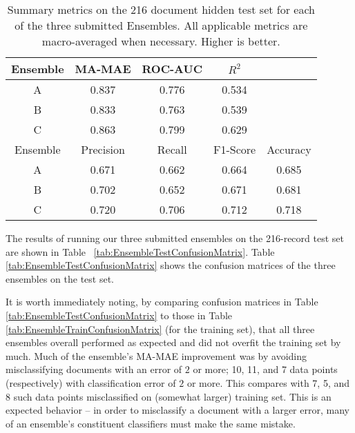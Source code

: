 \begin{table}
\centering
    \begin{tabular}{|c|c|c|c|c|}
        \hline
        \textsf{ Ensemble } & \textsf{ MA-MAE } & \textsf{ ROC-AUC } & \textsf{ $R^2$ } & \\
        \hline
       \cellcolor{gray!15} \textsf{ A } & 0.837 & 0.776 & 0.534 & \\ 
       \cellcolor{gray!15} \textsf{ B } & 0.833 & 0.763 & 0.539 & \\ 
       \cellcolor{gray!15} \textsf{ C } & \cellcolor{gray!15} 0.863 & \cellcolor{gray!15} 0.799 & \cellcolor{gray!15} 0.629 & \\ 
       \hline
        \textsf{ Ensemble } & \textsf{ Precision } & \textsf{ Recall } & \textsf{ F1-Score } & \textsf{ Accuracy } \\
        \hline
       \cellcolor{gray!15} \textsf{ A } & 0.671 & 0.662 & 0.664 & 0.685 \\ 
       \cellcolor{gray!15} \textsf{ B } & 0.702 & 0.652 & 0.671 & 0.681 \\ 
       \cellcolor{gray!15} \textsf{ C } & \cellcolor{gray!15} 0.720 & \cellcolor{gray!15} 0.706 & \cellcolor{gray!15} 0.712 & \cellcolor{gray!15} 0.718 \\ 
        \hline
    \end{tabular}
    \caption{Summary metrics on the 216 document hidden test set for each of the three submitted Ensembles. All applicable metrics are macro-averaged when necessary. Higher is better.}
    \label{tab:EnsembleTestSummaryMetrics}
\end{table}



The results of running our three submitted ensembles on the
216-record test set are shown in Table ~\ref{tab:EnsembleTestConfusionMatrix}.
Table \ref{tab:EnsembleTestConfusionMatrix} shows the confusion
matrices of the three ensembles on the test set.

It is worth immediately noting, by comparing confusion
matrices in  Table \ref{tab:EnsembleTestConfusionMatrix}
to those in Table \ref{tab:EnsembleTrainConfusionMatrix}
(for the training set), that all three ensembles overall
performed as expected and did not overfit the training
set by much. Much of the ensemble's MA-MAE improvement was by avoiding misclassifying documents
with an error of $2$ or more; 10, 11, and 7 data points (respectively) with classification
error of $2$ or more. This compares with 7, 5, and 8 such
data points misclassified on (somewhat larger) training set. 
This is an expected behavior -- in order to misclassify a document with a larger error,
many of an ensemble's constituent classifiers must make the same mistake.

